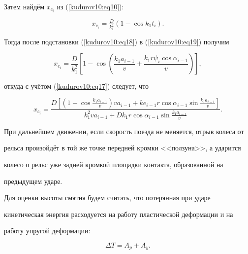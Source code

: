 Затем найдём $x_{c_i}$ из  (\ref{kudurov10:eq10}):

\begin{equation}

\label{kudurov10:eq19}

 x_{c_i } =\tfrac{D}{k_1^2}\left(1-\cos k_1 t_i \right).

\end{equation}

Тогда после подстановки (\ref{kudurov10:eq18}) в (\ref{kudurov10:eq19}) получим

$$

x_{c_i} = \frac{D}{k_1^2}\left[ 1-\cos \left( \frac{k_1 a_{i-1}

}{v} + \frac{k_1 r \psi_i \cos \alpha_{i-1}}{v} \right)

\right],

$$

откуда с учётом (\ref{kudurov10:eq17}) следует, что

$$

x_{c_i} = \frac{D \left[ \left( 1-\cos \frac{k_1 a_{i-1}}{v}

\right)v a_{i-1} + ke_{i-1} r\cos \alpha_{i-1} \sin \frac{k_1 a_{i-1}

}{v} \right]}{k_1^2 v a_{i-1} + D k_1 r\cos \alpha_{i-1} \sin

\frac{k_1 a_{i-1}}{v}}.

$$





При дальнейшем движении, если скорость поезда не меняется, отрыв колеса от

рельса произойдёт в той же точке передней кромки <<ползуна>>, а ударится

колесо о рельс уже задней кромкой площадки контакта, образованной на

предыдущем ударе.



Для оценки высоты смятия будем считать, что потерянная при ударе

кинетическая энергия расходуется на работу пластической деформации и на

работу упругой деформации:

\begin{equation}

\label{kudurov10:eq20}

\Delta T=A_p + A_y.

\end{equation}



